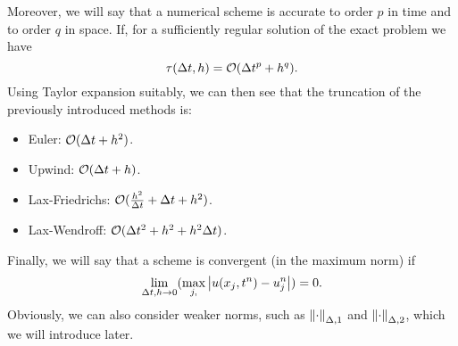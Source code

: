 Moreover, we will say that a numerical scheme is accurate to order \(p\) in time and to order \(q\) in space. If, for a sufficiently regular solution of the exact problem we have 
\[
    \tau(\Delta t, h) = \mathcal{O}(\Delta t^p + h^q).
\]
Using Taylor expansion suitably, we can then see that the truncation of the previously introduced methods is: 
\begin{itemize}
    \item Euler: \(\mathcal{O}(\Delta t + h^2)\).
    \item Upwind: \(\mathcal{O}(\Delta t + h)\).
    \item Lax-Friedrichs: \(\mathcal{O}(\frac{h^2}{\Delta t} + \Delta t + h^2)\).
    \item Lax-Wendroff: \(\mathcal{O}(\Delta t^2 + h^2 +h^2\Delta t)\).
\end{itemize}
Finally, we will say that a scheme is convergent (in the maximum norm) if 
\[
    \lim_{\Delta t, h \to 0} (\max_{j,} \abs{u(x_j, t^n) - u_j^n}) = 0.
\]
Obviously, we can also consider weaker norms, such as \(\norm{\cdot}_{\Delta,1}\) and \(\norm{\cdot}_{\Delta, 2}\), which we will introduce later.
